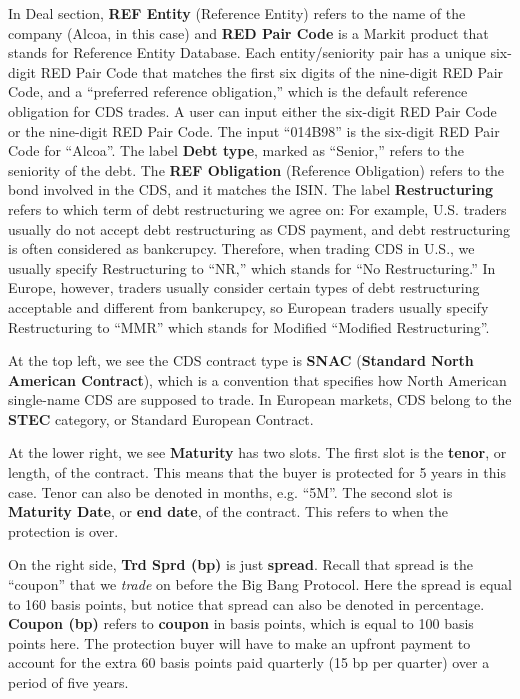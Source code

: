 \documentclass{jss}
\begin{document}
In Deal section, \textbf{REF Entity} (Reference Entity) refers to the name of the company (Alcoa, in this case) and \textbf{RED Pair Code} is a Markit product that stands for Reference Entity Database. Each entity/seniority pair has a unique six-digit RED Pair Code that matches the first six digits of the nine-digit RED Pair Code, and a ``preferred reference obligation,'' which is the default reference obligation for CDS  trades. A user can input either the six-digit RED Pair Code or the nine-digit RED Pair Code. The input ``014B98'' is the six-digit RED Pair Code for ``Alcoa''. The label \textbf{Debt type}, marked as ``Senior,'' refers to the seniority of the debt. The \textbf{REF Obligation} (Reference Obligation) refers to the bond involved in the CDS, and it matches the ISIN. The label \textbf{Restructuring} refers to which term of debt restructuring we agree on: For example, U.S. traders usually do not accept debt restructuring as CDS payment, and debt restructuring is often considered as bankcrupcy. Therefore, when trading CDS in U.S., we usually specify Restructuring to ``NR,'' which stands for ``No Restructuring.'' In Europe, however, traders usually consider certain types of debt restructuring acceptable and different from bankcrupcy, so European traders usually specify Restructuring to ``MMR'' which stands for Modified ``Modified Restructuring''. 

At the top left, we see the CDS contract type is \textbf{SNAC} (\textbf{Standard North American Contract}), which is a convention that specifies how North American single-name CDS are supposed to trade. In European markets, CDS belong to the \textbf{STEC} category, or Standard European Contract.

At the lower right, we see \textbf{Maturity} has two slots. The first slot is the \textbf{tenor}, or length, of the contract. This means that the buyer is protected for 5 years in this case. Tenor can also be denoted in months, e.g. ``5M''. The second slot is \textbf{Maturity Date}, or \textbf{end date}, of the contract. This refers to when the protection is over. 

On the right side, \textbf{Trd Sprd (bp)} is just \textbf{spread}. Recall that spread is the ``coupon'' that we \textit{trade} on before the Big Bang Protocol. Here the spread is equal to 160 basis points, but notice that spread can also be denoted in percentage. \textbf{Coupon (bp)} refers to \textbf{coupon} in basis points, which is equal to 100 basis points here. The protection buyer will have to make an upfront payment to account for the extra 60 basis points paid quarterly (15 bp per quarter) over a period of five years.
\end{document}
